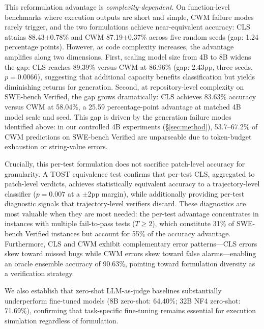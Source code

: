 This reformulation advantage is \emph{complexity-dependent}. On function-level benchmarks where execution outputs are short and simple, CWM failure modes rarely trigger, and the two formulations achieve near-equivalent accuracy: CLS attains 88.43$\pm$0.78\% and CWM 87.19$\pm$0.37\% across five random seeds (gap: 1.24 percentage points). However, as code complexity increases, the advantage amplifies along two dimensions. First, scaling model size from 4B to 8B widens the gap: CLS reaches 89.39\% versus CWM at 86.96\% (gap: 2.43pp, three seeds, $p = 0.0066$), suggesting that additional capacity benefits classification but yields diminishing returns for generation. Second, at repository-level complexity on SWE-bench Verified, the gap grows dramatically: CLS achieves 83.63\% accuracy versus CWM at 58.04\%, a 25.59 percentage-point advantage at matched 4B model scale and seed. This gap is driven by the generation failure modes identified above: in our controlled 4B experiments (\S\ref{sec:method}), 53.7--67.2\% of CWM predictions on SWE-bench Verified are unparseable due to token-budget exhaustion or string-value errors.

Crucially, this per-test formulation does not sacrifice patch-level accuracy for granularity. A TOST equivalence test confirms that per-test CLS, aggregated to patch-level verdicts, achieves statistically equivalent accuracy to a trajectory-level classifier ($p = 0.007$ at a $\pm$2pp margin), while additionally providing per-test diagnostic signals that trajectory-level verifiers discard. These diagnostics are most valuable when they are most needed: the per-test advantage concentrates in instances with multiple fail-to-pass tests ($T \geq 2$), which constitute 31\% of SWE-bench Verified instances but account for 55\% of the accuracy advantage. Furthermore, CLS and CWM exhibit complementary error patterns---CLS errors skew toward missed bugs while CWM errors skew toward false alarms---enabling an oracle ensemble accuracy of 90.63\%, pointing toward formulation diversity as a verification strategy.

We also establish that zero-shot LLM-as-judge baselines substantially underperform fine-tuned models (8B zero-shot: 64.40\%; 32B NF4 zero-shot: 71.69\%), confirming that task-specific fine-tuning remains essential for execution simulation regardless of formulation.


